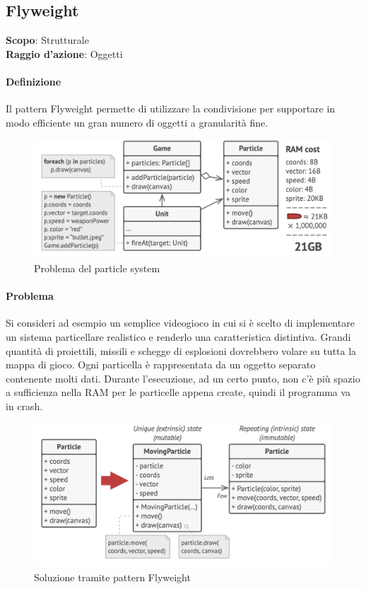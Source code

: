 \subsection{Flyweight}
\label{flyweight}

\textbf{Scopo}: Strutturale \\
\textbf{Raggio d'azione}: Oggetti

\paragraph{Definizione} Il pattern Flyweight permette di utilizzare la condivisione per supportare in modo efficiente un gran numero di oggetti a granularità fine.

\begin{figure}[H]
    \centering
    \includegraphics[width=1\linewidth]{assets/pattern/flyweight/flyweight-problema.png}
    \caption{Problema del particle system}
\end{figure}

\paragraph{Problema} Si consideri ad esempio un semplice videogioco in cui si è scelto di implementare un sistema particellare realistico e renderlo una caratteristica distintiva. Grandi quantità di proiettili, missili e schegge di esplosioni dovrebbero volare su tutta la mappa di gioco. Ogni particella è rappresentata da un oggetto separato contenente molti dati. Durante l’esecuzione, ad un certo punto, non c'è più spazio a sufficienza nella RAM per le particelle appena create, quindi il programma va in crash.

\begin{figure}[H]
    \centering
    \includegraphics[width=1\linewidth]{assets/pattern/flyweight/flyweight-soluzione.png}
    \caption{Soluzione tramite pattern Flyweight}
\end{figure}

